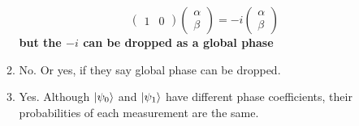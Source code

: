 \documentclass[12pt]{article}
\begin{document}
\begin{enumerate}[font=\bfseries]
\begin{enumerate}
\[\begin{pmatrix}
                1 & 0
                \end{pmatrix} 
                 \begin{pmatrix} 
                \alpha \\ \beta
                \end{pmatrix} 
                =
                -i
                \begin{pmatrix} 
                \alpha \\ \beta
                \end{pmatrix} 
                \] {\bf but the $-i$ can be dropped as a global phase}
        \item No. Or yes, if they say global phase can be dropped.
        \item Yes. Although $\ket{\psi_0}$ and $\ket{\psi_1}$ have different phase coefficients, their probabilities of each measurement are the same.
    \end{enumerate}
    

\end{enumerate}
\end{document}
